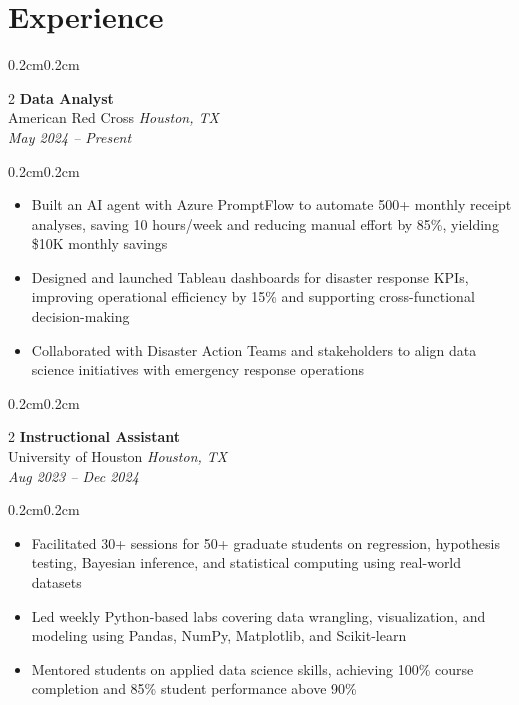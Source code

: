 \documentclass[10pt, letterpaper]{article}
\newenvironment{highlights}{\begin{itemize}[topsep=0.10 cm, parsep=0.10 cm, itemsep=0pt, leftmargin=0.6cm]}{\end{itemize}}
\newenvironment{onecolentry}{\begin{adjustwidth}{0.2cm}{0.2cm}}{\end{adjustwidth}}
\newenvironment{twocolentry}[2][]{\onecolentry\def\secondColumn{#2}\setcolumnwidth{\fill, 4.5 cm}\begin{paracol}{2}}{\switchcolumn \raggedleft \secondColumn\end{paracol}\endonecolentry}
\begin{document}
\section{Experience}
\begin{twocolentry}{\textit{Houston, TX} \\
\textit{May 2024 – Present}}
    \textbf{Data Analyst} \\
    American Red Cross
\end{twocolentry}
\vspace{0.10 cm}
\begin{onecolentry}
\begin{highlights}
\item Built an AI agent with Azure PromptFlow to automate 500+ monthly receipt analyses, saving 10 hours/week and reducing manual effort by 85\%, yielding \$10K monthly savings
\item Designed and launched Tableau dashboards for disaster response KPIs, improving operational efficiency by 15\% and supporting cross-functional decision-making
\item Collaborated with Disaster Action Teams and stakeholders to align data science initiatives with emergency response operations
\end{highlights}
\end{onecolentry}

\vspace{0.2 cm}

\begin{twocolentry}{\textit{Houston, TX} \\
\textit{Aug 2023 – Dec 2024}}
    \textbf{Instructional Assistant} \\
    University of Houston
\end{twocolentry}
\vspace{0.10 cm}
\begin{onecolentry}
\begin{highlights}
\item Facilitated 30+ sessions for 50+ graduate students on regression, hypothesis testing, Bayesian inference, and statistical computing using real-world datasets
\item Led weekly Python-based labs covering data wrangling, visualization, and modeling using Pandas, NumPy, Matplotlib, and Scikit-learn
\item Mentored students on applied data science skills, achieving 100\% course completion and 85\% student performance above 90\%
\end{highlights}
\end{onecolentry}
\end{document}
